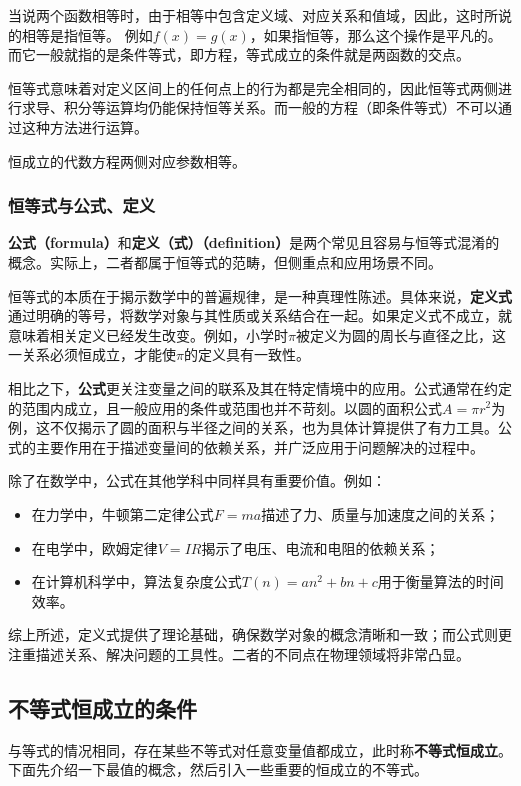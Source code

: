 当说两个函数相等时，由于相等中包含定义域、对应关系和值域，因此，这时所说的相等是指恒等。
例如$f(x)=g(x)$，如果指恒等，那么这个操作是平凡的。而它一般就指的是条件等式，即方程，等式成立的条件就是两函数的交点。

恒等式意味着对定义区间上的任何点上的行为都是完全相同的，因此恒等式两侧进行求导、积分等运算均仍能保持恒等关系。而一般的方程（即条件等式）不可以通过这种方法进行运算。

恒成立的代数方程两侧对应参数相等。

\subsubsection{恒等式与公式、定义}

\textbf{公式（formula）}和\textbf{定义（式）（definition）}是两个常见且容易与恒等式混淆的概念。实际上，二者都属于恒等式的范畴，但侧重点和应用场景不同。

恒等式的本质在于揭示数学中的普遍规律，是一种真理性陈述。具体来说，\textbf{定义式}通过明确的等号，将数学对象与其性质或关系结合在一起。如果定义式不成立，就意味着相关定义已经发生改变。例如，小学时$\pi$被定义为圆的周长与直径之比，这一关系必须恒成立，才能使$\pi$的定义具有一致性。

相比之下，\textbf{公式}更关注变量之间的联系及其在特定情境中的应用。公式通常在约定的范围内成立，且一般应用的条件或范围也并不苛刻。以圆的面积公式$A = \pi r^2$为例，这不仅揭示了圆的面积与半径之间的关系，也为具体计算提供了有力工具。公式的主要作用在于描述变量间的依赖关系，并广泛应用于问题解决的过程中。

除了在数学中，公式在其他学科中同样具有重要价值。例如：
\begin{itemize}
\item 在力学中，牛顿第二定律公式$F = ma$描述了力、质量与加速度之间的关系；
\item 在电学中，欧姆定律$V = IR$揭示了电压、电流和电阻的依赖关系；
\item 在计算机科学中，算法复杂度公式$T(n) = an^2 + bn + c$用于衡量算法的时间效率。
\end{itemize}

综上所述，定义式提供了理论基础，确保数学对象的概念清晰和一致；而公式则更注重描述关系、解决问题的工具性。二者的不同点在物理领域将非常凸显。

\subsection{不等式恒成立的条件}

与等式的情况相同，存在某些不等式对任意变量值都成立，此时称\textbf{不等式恒成立}。下面先介绍一下最值的概念，然后引入一些重要的恒成立的不等式。

